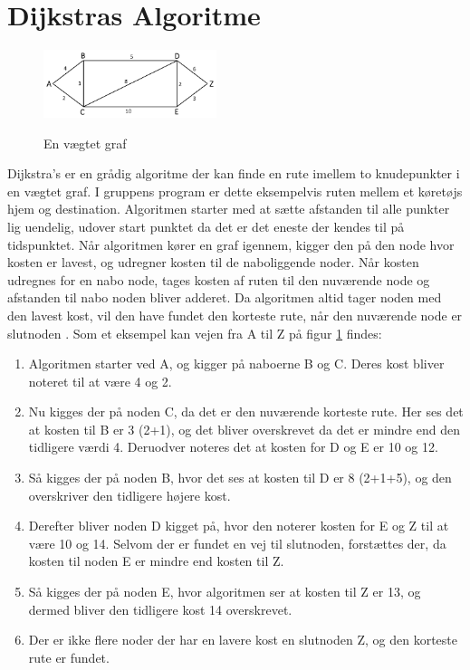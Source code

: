 \section{Dijkstras Algoritme}
\begin{figure}
    \centering
	\includegraphics[width=0.45\textwidth]{Pictures/Teoriafsnit/Figurfiler/Graf.png}
	\label{fig:dijkstrasgraf}
	\caption{En vægtet graf}
\end{figure}

Dijkstra's er en grådig algoritme der kan finde en rute imellem to knudepunkter i en vægtet graf. I gruppens program er dette eksempelvis ruten mellem et køretøjs hjem og destination. Algoritmen starter med at sætte afstanden til alle punkter lig uendelig, udover start punktet da det er det eneste der kendes til på tidspunktet. Når algoritmen kører en graf igennem, kigger den på den node hvor kosten er lavest, og udregner kosten til de naboliggende noder. Når kosten udregnes for en nabo node, tages kosten af ruten til den nuværende node og afstanden til nabo noden bliver adderet. Da algoritmen altid tager noden med den lavest kost, vil den have fundet den korteste rute, når den nuværende node er slutnoden \cite[s. 681-684]{DMATBOGEN}. Som et eksempel kan vejen fra A til Z på figur \ref{fig:dijkstrasgraf} findes:

\begin{enumerate}
\item Algoritmen starter ved A, og kigger på naboerne B og C. Deres kost bliver noteret til at være 4 og 2.
\item Nu kigges der på noden C, da det er den nuværende korteste rute. Her ses det at kosten til B er 3 (2+1), og det bliver overskrevet da det er mindre end den tidligere værdi 4. Deruodver noteres det at kosten for D og E er 10 og 12.
\item Så kigges der på noden B, hvor det ses at kosten til D er 8 (2+1+5), og den overskriver den tidligere højere kost.
\item Derefter bliver noden D kigget på, hvor den noterer kosten for E og Z til at være 10 og 14. Selvom der er fundet en vej til slutnoden, forstættes der, da kosten til noden E er mindre end kosten til Z.
\item Så kigges der på noden E, hvor algoritmen ser at kosten til Z er 13, og dermed bliver den tidligere kost 14 overskrevet.
\item Der er ikke flere noder der har en lavere kost en slutnoden Z, og den korteste rute er fundet.
\end{enumerate}

